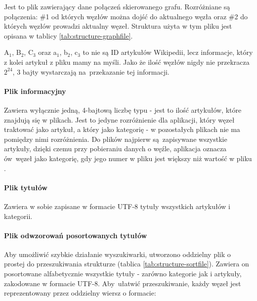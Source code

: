 Jest to plik zawierający dane połączeń skierowanego grafu. Rozróżniane są połączenia: \#1 od których węzłów można dojść do aktualnego węzła oraz \#2 do których węzłów prowadzi aktualny węzeł. Struktura użyta w tym pliku jest opisana w tablicy \ref{tab:structure-graphfile}.


A$_{1}$, B$_{2}$, C$_{3}$ oraz a$_{1}$, b$_{2}$, c$_{3}$ to nie są ID artykułów Wikipedii, lecz informacje, który z kolei artykuł z pliku  mamy na myśli. Jako że ilość węzłów nigdy nie przekracza $2^{24}$, 3 bajty wystarczają na~przekazanie tej informacji.

\paragraph{Plik informacyjny }

Zawiera wyłącznie jedną, 4-bajtową liczbę typu  - jest to ilość artykułów, które znajdują się w plikach. Jest to jedyne rozróżnienie dla aplikacji, który węzeł traktować jako artykuł, a który jako kategorię - w pozostałych plikach nie ma pomiędzy nimi rozróżnienia. Do plików najpierw są~zapisywane wszystkie artykuły, dzięki czemu przy pobieraniu danych o węźle, aplikacja oznacza ów~węzeł jako kategorię, gdy jego numer w pliku  jest większy niż wartość w pliku . 

\paragraph{Plik tytułów }

Zawiera w sobie zapisane w formacie UTF-8 tytuły wszystkich artykułów i kategorii.

\paragraph{Plik odwzorowań posortowanych tytułów }

Aby umożliwić szybkie działanie wyszukiwarki, utworzono oddzielny plik o prostej do przeszukiwania strukturze (tablica \ref{tab:structure-sortfile}). Zawiera on posortowane alfabetycznie wszystkie tytuły - zarówno kategorie jak i artykuły, zakodowane w formacie UTF-8. Aby~ułatwić przeszukiwanie, każdy węzeł jest reprezentowany przez oddzielny wiersz o formacie:

